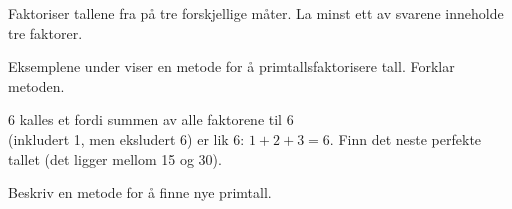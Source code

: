 Faktoriser tallene fra  på tre forskjellige måter. La minst ett av svarene inneholde tre faktorer.

Eksemplene under viser en metode for å primtallsfaktorisere tall. Forklar metoden.
\begin{center}
	\parbox{0.35\linewidth}{
		} \qquad
	\parbox{0.35\linewidth}{
		}
\end{center} 

 \vs
{}

6 kalles et  fordi summen av alle faktorene til 6 \\(inkludert 1, men eksludert 6) er lik 6: $ 1+2+3=6 $. Finn det neste perfekte tallet (det ligger mellom 15 og 30).

Beskriv en metode for å finne nye primtall.


